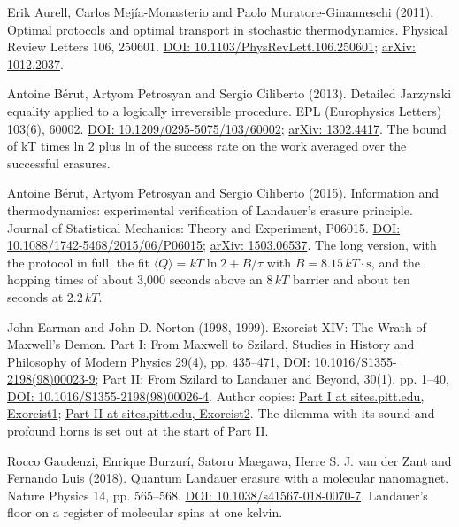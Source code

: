 \documentclass[11pt,twoside]{article}
\theoremstyle{thielethm}
\theoremstyle{thieledef}
\theoremstyle{thieledef}
\theoremstyle{thieledef}
\theoremstyle{thielethm}
\theoremstyle{thieleobs}
\theoremstyle{thielethm}
\begin{document}
\noindent Erik Aurell, Carlos Mej\'ia-Monasterio and Paolo Muratore-Ginanneschi (2011). Optimal protocols and optimal transport in stochastic thermodynamics. Physical Review Letters 106, 250601. \href{https://doi.org/10.1103/PhysRevLett.106.250601}{DOI: 10.1103/PhysRevLett.106.250601}; \href{https://arxiv.org/abs/1012.2037}{arXiv: 1012.2037}.
\par\medskip

\noindent Antoine B\'erut, Artyom Petrosyan and Sergio Ciliberto (2013). Detailed Jarzynski equality applied to a logically irreversible procedure. EPL (Europhysics Letters) 103(6), 60002. \href{https://doi.org/10.1209/0295-5075/103/60002}{DOI: 10.1209/0295-5075/103/60002}; \href{https://arxiv.org/abs/1302.4417}{arXiv: 1302.4417}. The bound of kT times ln 2 plus ln of the success rate on the work averaged over the successful erasures.
\par\medskip

\noindent Antoine B\'erut, Artyom Petrosyan and Sergio Ciliberto (2015). Information and thermodynamics: experimental verification of Landauer's erasure principle. Journal of Statistical Mechanics: Theory and Experiment, P06015. \href{https://doi.org/10.1088/1742-5468/2015/06/P06015}{DOI: 10.1088/1742-5468/2015/06/P06015}; \href{https://arxiv.org/abs/1503.06537}{arXiv: 1503.06537}. The long version, with the protocol in full, the fit $\langle Q\rangle = kT\ln 2 + B/\tau$ with $B = 8.15\,kT\cdot\mathrm{s}$, and the hopping times of about 3,000 seconds above an $8\,kT$ barrier and about ten seconds at $2.2\,kT$.
\par\medskip

\noindent John Earman and John D. Norton (1998, 1999). Exorcist XIV: The Wrath of Maxwell's Demon. Part I: From Maxwell to Szilard, Studies in History and Philosophy of Modern Physics 29(4), pp. 435--471, \href{https://doi.org/10.1016/S1355-2198(98)00023-9}{DOI: 10.1016/S1355-2198(98)00023-9}; Part II: From Szilard to Landauer and Beyond, 30(1), pp. 1--40, \href{https://doi.org/10.1016/S1355-2198(98)00026-4}{DOI: 10.1016/S1355-2198(98)00026-4}. Author copies: \href{https://sites.pitt.edu/~jdnorton/papers/ExorcistXIV/Exorcist1.pdf}{Part I at sites.pitt.edu, Exorcist1}; \href{https://sites.pitt.edu/~jdnorton/papers/ExorcistXIV/Exorcist2.pdf}{Part II at sites.pitt.edu, Exorcist2}. The dilemma with its sound and profound horns is set out at the start of Part II.
\par\medskip

\noindent Rocco Gaudenzi, Enrique Burzur\'i, Satoru Maegawa, Herre S. J. van der Zant and Fernando Luis (2018). Quantum Landauer erasure with a molecular nanomagnet. Nature Physics 14, pp. 565--568. \href{https://doi.org/10.1038/s41567-018-0070-7}{DOI: 10.1038/s41567-018-0070-7}. Landauer's floor on a register of molecular spins at one kelvin.
\par\medskip
\end{document}
